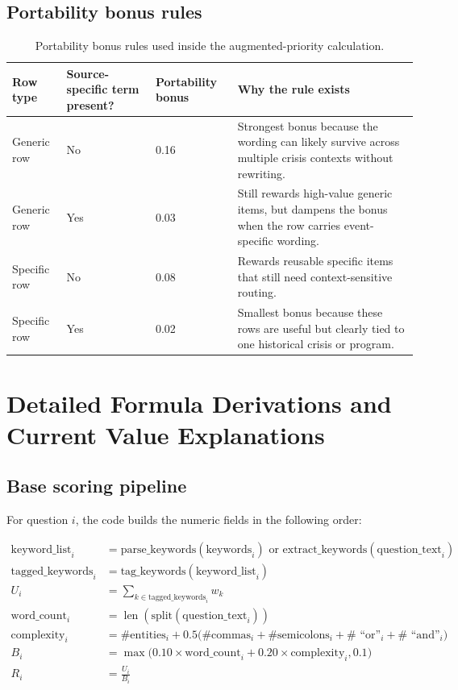 \documentclass[12pt]{article}
\begin{document}
\subsection{Portability bonus rules}

\begin{table}[H]
\centering
\footnotesize
\begin{tabularx}{0.84\textwidth}{L{0.30\textwidth} L{0.24\textwidth} R{0.10\textwidth} Y}
\toprule
Row type & Source-specific term present? & Portability bonus & Why the rule exists \\
\midrule
Generic row & No & 0.16 & Strongest bonus because the wording can likely survive across multiple crisis contexts without rewriting. \\
Generic row & Yes & 0.03 & Still rewards high-value generic items, but dampens the bonus when the row carries event-specific wording. \\
Specific row & No & 0.08 & Rewards reusable specific items that still need context-sensitive routing. \\
Specific row & Yes & 0.02 & Smallest bonus because these rows are useful but clearly tied to one historical crisis or program. \\
\bottomrule
\end{tabularx}
\caption{Portability bonus rules used inside the augmented-priority calculation.}
\end{table}

\section{Detailed Formula Derivations and Current Value Explanations}

\subsection{Base scoring pipeline}

For question $i$, the code builds the numeric fields in the following order:

\begin{align*}
\text{keyword\_list}_i &= \text{parse\_keywords}(\text{keywords}_i) \text{ or } \text{extract\_keywords}(\text{question\_text}_i) \\
\text{tagged\_keywords}_i &= \text{tag\_keywords}(\text{keyword\_list}_i) \\
U_i &= \sum_{k \in \text{tagged\_keywords}_i} w_k \\
\text{word\_count}_i &= \operatorname{len}(\text{split}(\text{question\_text}_i)) \\
\text{complexity}_i &= \#\text{entities}_i + 0.5\bigl(\#\text{commas}_i + \#\text{semicolons}_i + \#\text{ ``or''}_i + \#\text{ ``and''}_i\bigr) \\
B_i &= \max\bigl(0.10 \times \text{word\_count}_i + 0.20 \times \text{complexity}_i, 0.1\bigr) \\
R_i &= \frac{U_i}{B_i}
\end{align*}
\end{document}
